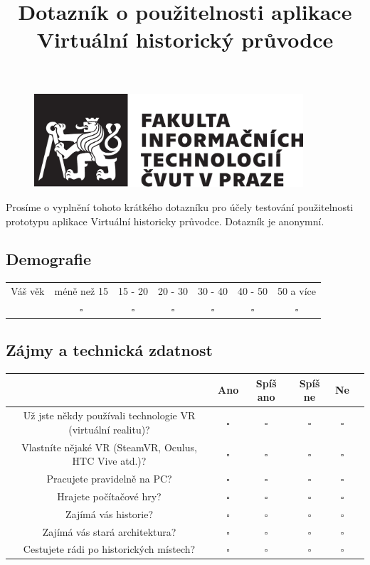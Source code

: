 \documentclass{article}
\title{Dotazník o použitelnosti aplikace Virtuální historický průvodce}
\date{}
\begin{document}
\maketitle
\begin{figure}
\centering
  		\includegraphics[width=10cm,keepaspectratio]{cvut-logo-bw.pdf}
\end{figure}
Prosíme o vyplnění tohoto krátkého dotazníku pro účely testování použitelnosti prototypu aplikace Virtuální historicky průvodce. Dotazník je anonymní.



\subsection*{Demografie}

\begin{center}
\begin{tabular}{|c |c| c| c|c| c| c| }
 \hline
Váš věk & méně než 15 & 15 - 20 & 20 - 30 & 30 - 40 & 40 - 50 & 50 a více\\ 
  & $\square$ & $\square$ & $\square$ & $\square$ & $\square$ & $\square$\\ 
 \hline
\end{tabular}
\end{center}

\subsection*{Zájmy a technická zdatnost}

\begin{center}
\begin{tabular}{|c |c| c| c |c |c |}
 \hline
 & Ano & Spíš ano & Spíš ne & Ne\\ 
 \hline
 Už jste někdy používali technologie VR (virtuální realitu)? & $\square$ & $\square$& $\square$& $\square$\\ 
 \hline
 Vlastníte nějaké VR (SteamVR, Oculus, HTC Vive atd.)? & $\square$ & $\square$& $\square$& $\square$\\ 
 \hline
 Pracujete pravidelně na PC? & $\square$ & $\square$& $\square$& $\square$\\ 
 \hline
 Hrajete počítačové hry? & $\square$ & $\square$& $\square$& $\square$\\ 
 \hline
 Zajímá vás historie? & $\square$ & $\square$& $\square$& $\square$\\ 
 \hline
 Zajímá vás stará architektura? & $\square$ & $\square$& $\square$& $\square$\\ 
 \hline
 Cestujete rádi po historických místech? & $\square$ & $\square$& $\square$& $\square$\\ 
 \hline
\end{tabular}
\end{center}
\end{document}
